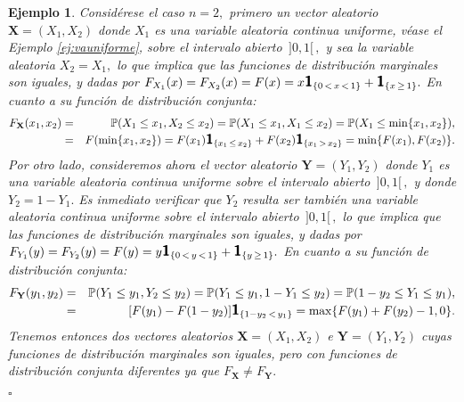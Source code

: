 \documentclass[spanish,10pt,letterpaper]{article}
\newtheorem{ejem}{Ejemplo}
\newcommand{\prob}{\mathbb{P}}
\newcommand{\indic}{\textbf{\textsf{\large{1}}}}
\newcommand{\qed}{\begin{flushright}$\square$\end{flushright}}
\begin{document}
\begin{ejem}\label{ej:maginalesiguales}
    Considérese el caso $n=2,$ primero un vector aleatorio $\mathbf{X}=(X_1,X_2)$ donde $X_1$ es una variable aleatoria continua uniforme, véase el Ejemplo \ref{ej:vauniforme}, sobre el intervalo abierto $\,]0,1[\,,$ y sea la variable aleatoria $X_2=X_1,$ lo que implica que las funciones de distribución marginales son iguales, y dadas por $F_{X_1}(x)=F_{X_2}(x)=F(x)=x\indic_{\{0\,<\,x\,<\,1\}}+\indic_{\{x\,\geq\,1\}}.$ En cuanto a su función de distribución conjunta:
    \begin{eqnarray*}
        F_{\mathbf{X}}(x_1,x_2) &=& \prob(X_1\leq x_1,X_2\leq x_2) = \prob(X_1\leq x_1,X_1\leq x_2) = \prob(X_1\leq\min\{x_1,x_2\}), \\
                                &=& F(\min\{x_1,x_2\}) = F(x_1)\indic_{\{x_1\,\leq\,x_2\}} + F(x_2)\indic_{\{x_1\,>\,x_2\}} = \min\{F(x_1),F(x_2)\}.
    \end{eqnarray*}
    Por otro lado, consideremos ahora el vector aleatorio $\mathbf{Y}=(Y_1,Y_2)$ donde $Y_1$ es una variable aleatoria continua uniforme sobre el intervalo abierto $\,]0,1[\,,$ y donde $Y_2=1-Y_1.$ Es inmediato verificar que $Y_2$ resulta ser también una variable aleatoria continua uniforme sobre el intervalo abierto $\,]0,1[\,,$ lo que implica que las funciones de distribución marginales son iguales, y dadas por $F_{Y_1}(y)=F_{Y_2}(y)=F(y)=y\indic_{\{0\,<\,y\,<\,1\}}+\indic_{\{y\,\geq\,1\}}.$ En cuanto a su función de distribución conjunta:
    \begin{eqnarray*}
        F_{\mathbf{Y}}(y_1,y_2) &=& \prob(Y_1\leq y_1,Y_2\leq y_2) = \prob(Y_1\leq y_1,1-Y_1\leq y_2) = \prob(1-y_2\leq Y_1\leq y_1), \\
                                &=& [F(y_1)-F(1-y_2)]\indic_{\{1-y_2\,<\,y_1\}} = \max\{F(y_1)+F(y_2)-1,0\}.
    \end{eqnarray*}
    Tenemos entonces dos vectores aleatorios $\mathbf{X}=(X_1,X_2)$ e $\mathbf{Y}=(Y_1,Y_2)$ cuyas funciones de distribución marginales son iguales, pero con funciones de distribución conjunta diferentes ya que $F_{\mathbf{X}}\neq F_{\mathbf{Y}}.$ \qed
\end{ejem}


\medskip
\end{document}
